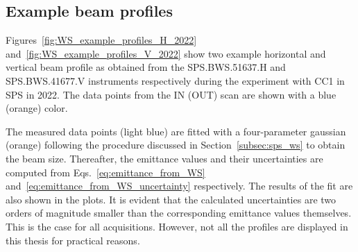 \subsection{Example beam profiles}
Figures~\ref{fig:WS_example_profiles_H_2022} and~\ref{fig:WS_example_profiles_V_2022} show two example horizontal and vertical beam profile as obtained from the SPS.BWS.51637.H and SPS.BWS.41677.V instruments respectively during the experiment with CC1 in SPS in 2022. The data points from the IN (OUT) scan are shown with a blue (orange) color. 

The measured data points (light blue) are fitted with a four-parameter gaussian (orange) following the procedure discussed in Section~\ref{subsec:sps_ws} to obtain the beam size. Thereafter, the emittance values and their uncertainties are computed from Eqs.~\eqref{eq:emittance_from_WS} and~\eqref{eq:emittance_from_WS_uncertainty} respectively. The results of the fit are also shown in the plots. It is evident that the calculated uncertainties are two orders of magnitude smaller than the corresponding emittance values themselves. This is the case for all acquisitions. However, not all the profiles are displayed in this thesis for practical reasons.

